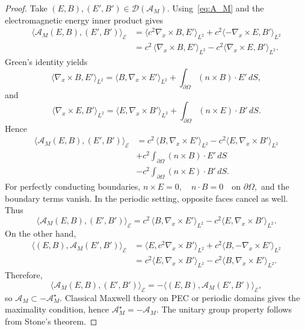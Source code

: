 \documentclass[AMA,Times2COL]{WileyNJDv5}
\begin{document}
\begin{proof}
Take $(E,B),(E',B')\in\mathcal{D}(\mathcal{A}_M)$.  
Using~\eqref{eq:A_M} and the electromagnetic energy inner product gives
\begin{align*}
\big\langle \mathcal{A}_M(E,B),(E',B')\big\rangle_{\mathcal E}
&=
\langle c^{2}\nabla_x\times B, E'\rangle_{L^{2}}
+
c^2\langle -\nabla_x\times E, B'\rangle_{L^{2}}\\
&=
c^{2}\,\langle \nabla_x\times B, E'\rangle_{L^{2}}
-
c^2\langle \nabla_x\times E, B'\rangle_{L^{2}} .
\end{align*}
Green's identity yields
\[
\langle \nabla_x\times B , E' \rangle_{L^{2}}
=
\langle B , \nabla_x\times E' \rangle_{L^{2}}
+
\int_{\partial\Omega} (n\times B)\!\cdot E'\, dS,
\]
and
\[
\langle \nabla_x\times E , B' \rangle_{L^{2}}
=
\langle E , \nabla_x\times B' \rangle_{L^{2}}
+
\int_{\partial\Omega} (n\times E)\!\cdot B'\, dS .
\]
Hence
\begin{align*}
\big\langle \mathcal{A}_M(E,B),(E',B')\big\rangle_{\mathcal E}
&=
c^{2}\,\langle B,\nabla_x\times E' \rangle_{L^{2}}
-
c^2\langle E,\nabla_x\times B' \rangle_{L^{2}}\\ 
&+
c^{2}\!\int_{\partial\Omega} (n\times B)\!\cdot E'\,dS\\
&-
c^2\!\int_{\partial\Omega} (n\times E)\!\cdot B'\,dS .
\end{align*}
For perfectly conducting boundaries,
\(
n\times E =0,\quad n\cdot B=0
\quad\text{on }\partial\Omega,
\)
and the boundary terms vanish. In the periodic setting, opposite faces cancel as well. Thus
\[
\big\langle \mathcal{A}_M(E,B),(E',B')\big\rangle_{\mathcal E}
=
c^{2}\,\langle B,\nabla_x\times E' \rangle_{L^{2}}
-
c^2\langle E,\nabla_x\times B' \rangle_{L^{2}} .
\]
On the other hand,
\begin{align*}
\big\langle (E,B), \mathcal{A}_M(E',B') \big\rangle_{\mathcal E}
&=
\langle E,c^2\nabla_x\times B' \rangle_{L^{2}}
+
c^2\langle B,-\nabla_x\times E' \rangle_{L^{2}}\\
&=
c^2\langle E,\nabla_x\times B' \rangle_{L^{2}}
-
c^2\langle B,\nabla_x\times E' \rangle_{L^{2}} .
\end{align*}
Therefore,
\[
\big\langle \mathcal{A}_M(E,B),(E',B')\big\rangle_{\mathcal E}
=
-\big\langle (E,B),\mathcal{A}_M(E',B')\big\rangle_{\mathcal E},
\]
so $\mathcal{A}_M\subset -\mathcal{A}_M^\star$.
Classical Maxwell theory on PEC or periodic domains gives the maximality condition, hence $\mathcal{A}_M^\star=-\mathcal{A}_M$.
The unitary group property follows from Stone's theorem.
\end{proof}
\end{document}
